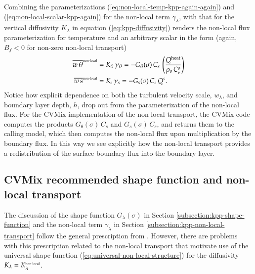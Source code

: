 Combining the parameterizations
(\ref{eq:non-local-temp-kpp-again-again}) and
(\ref{eq:non-local-scalar-kpp-again}) for the non-local term
$\gamma_{\lambda}$, with that for the vertical diffusivity
$K_{\lambda}$ in equation (\ref{eq:kpp-diffusivity}) renders the
non-local flux parameterization for temperature and an arbitrary
scalar in the form (again, $B_{f} < 0$ for non-zero non-local
transport)
\begin{subequations}
\begin{align}
\overline{w \, \theta}^{\mbox{\tiny non-local}} &= K_{\theta}  \, \gamma_{\theta}
  = 
 - G_{\theta}(\sigma) \, C_{s} \, \left( \frac{ Q^{\mbox{\scriptsize heat}}}{ \rho_{o}  \, C_{\mbox{\tiny p}}^{o} } \right)
\label{eq:non-local-flux-kpp-param-temp-again}
\\
\overline{w \, s}^{\mbox{\tiny non-local}} &= K_{s}  \, \gamma_{s}
  = 
 -G_{s}(\sigma) \, C_{s} \,  Q^{s}.
\label{eq:non-local-flux-kpp-param-scalar-again}
\end{align}
\end{subequations}
Notice how explicit dependence on both the turbulent velocity scale,
$w_{\lambda}$, and boundary layer depth, $h$, drop out from the
parameterization of the non-local flux.  For the CVMix implementation
of the non-local transport, the CVMix code computes the products
$G_{\theta}(\sigma) \, C_{s}$ and $G_{s}(\sigma) \, C_{s}$, and
returns them to the calling model, which then computes the non-local
flux upon multiplication by the boundary flux.  In this way we see
explicitly how the non-local transport provides a redistribution of
the surface boundary flux into the boundary layer.


\subsection{CVMix recommended shape function and non-local transport}
\label{subsection:kpp-shape-function-cvmix}

The discussion of the shape function $G_{\lambda}(\sigma)$ in Section
\ref{subsection:kpp-shape-function} and the non-local term
$\gamma_{\lambda}$ in Section \ref{subsection:kpp-non-local-transport}
follow the general prescription from \cite{LargeKPP}.  However, there
are problems with this prescription related to the non-local transport
that motivate use of the universal shape function
(\ref{eq:universal-non-local-structure}) for the diffusivity
$K_{\lambda} = K^{\mbox{\tiny non-local}}_{\lambda}$.



